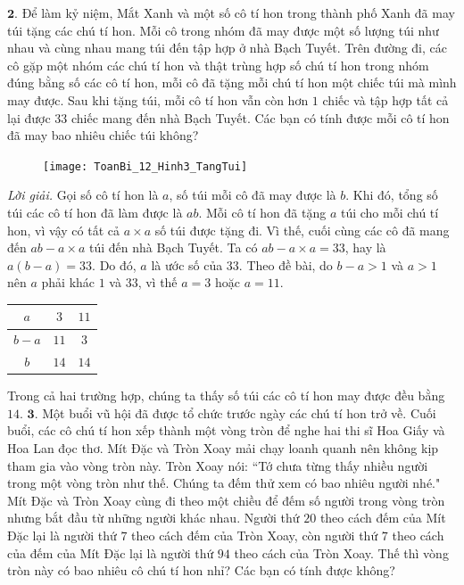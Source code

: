 \begin{multicols}{2}
	\vskip 0.1cm
	$\pmb{2.}$ Để làm kỷ niệm, Mắt Xanh và một số cô tí hon trong thành phố Xanh đã may túi tặng các chú tí hon. Mỗi cô trong nhóm đã may được một số lượng túi như nhau và cùng nhau mang túi đến tập hợp ở nhà Bạch Tuyết. 
	Trên đường đi, các cô gặp một nhóm các chú tí hon và thật trùng hợp số chú tí hon trong nhóm đúng bằng số các cô tí hon, mỗi cô đã tặng mỗi chú tí hon một chiếc túi mà mình may được. Sau khi tặng túi, mỗi cô tí hon vẫn còn hơn $1$ chiếc và tập hợp tất cả lại được $33$ chiếc mang đến nhà Bạch Tuyết. Các bạn có tính được mỗi cô tí hon đã may bao nhiêu chiếc túi không?
	\begin{figure}[H]
		\centering
		\vspace*{-5pt}
		\captionsetup{labelformat= empty, justification=centering}
		\texttt{[image: ToanBi\_12\_Hinh3\_TangTui]}
		\vspace*{-15pt}
	\end{figure}
	\textit{Lời giải.} Gọi số cô tí hon là $a$, số túi mỗi cô đã may được là $b$. Khi đó, tổng số túi các cô tí hon đã làm được là $ab$. Mỗi cô tí hon đã tặng $a$ túi cho mỗi chú tí hon, vì vậy có tất cả $a\times a$ số túi được tặng đi. Vì thế, cuối cùng các cô đã mang đến $ab - a\times a$ túi đến nhà Bạch Tuyết.
	\vskip 0.1cm
	Ta có $ab - a\times a =33$, hay là $a(b-a) = 33$. Do đó, $a$ là ước số của $33$. Theo đề bài, do $b - a > 1$ và $a>1$ nên $a$ phải khác $1$ và $33$, vì thế $a=3$ hoặc $a= 11$.
	\begin{table}[H]
		\centering
		\setlength{\tabcolsep}{10pt}
		\renewcommand{\arraystretch}{1.3}
		\begin{tabular}{|c|c|c|}
			\hline
			$a$&	$3$&	$11$\\
			\hline
			$b - a$&	$11$&	$3$\\
			\hline
			$b$&	$14$&	$14$\\
			\hline
		\end{tabular}
	\end{table}
	Trong cả hai trường hợp, chúng ta thấy số túi các cô tí hon may được đều bằng $14$.
	\vskip 0.1cm
	$\pmb{3.}$ Một buổi vũ hội đã được tổ chức trước ngày các chú tí hon trở về. Cuối buổi, các cô chú tí hon xếp thành một vòng tròn để nghe hai thi sĩ Hoa Giấy và Hoa Lan đọc thơ. Mít Đặc và Tròn Xoay mải chạy loanh quanh nên không kịp tham gia vào vòng tròn này. 
	\vskip 0.1cm
	Tròn Xoay nói: ``Tớ chưa từng thấy nhiều người trong một vòng tròn như thế. Chúng ta đếm thử xem có bao nhiêu người nhé." Mít Đặc và Tròn Xoay cùng đi theo một chiều để đếm số người trong vòng tròn nhưng bắt đầu từ những người khác nhau. Người thứ $20$ theo cách đếm của Mít Đặc lại là người thứ $7$ theo cách đếm của Tròn Xoay, còn người thứ $7$ theo cách của đếm của Mít Đặc lại là người thứ $94$ theo cách của Tròn Xoay. Thế thì vòng tròn này có bao nhiêu cô chú tí hon nhỉ? Các bạn có tính được không?

\end{multicols}
